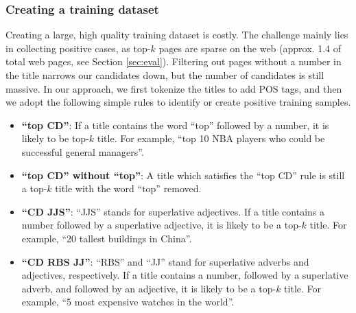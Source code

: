 \subsubsection{Creating a training dataset}
\label{sec:titleDataSet}
Creating a large, high quality training dataset is costly. The
challenge mainly lies in collecting positive cases, as top-$k$ pages
are sparse on the web (approx. 1.4\textperthousand{} of total web pages, see
Section \ref{sec:eval}). Filtering out pages without a number in
the title narrows our candidates down, but the number of candidates
is still massive.
In our approach, we first tokenize the titles to add POS
tags, and then we adopt the following simple rules to identify
or create positive training samples.
\begin{itemize}
\item \textbf{``top CD''}: If a title contains the word ``top''
  followed by a number, it is likely to be top-$k$ title. For example,
  ``top 10 NBA players who could be successful general managers''.
\item \textbf{``top CD'' without ``top''}: A title which satisfies the
``top CD'' rule is still a top-$k$ title with the word ``top'' removed.
\item \textbf{``CD JJS''}: ``JJS'' stands for superlative adjectives.
  If a title contains a number followed by a superlative adjective, it
  is likely to be a top-$k$ title.  For example, ``20 tallest
  buildings in China''.
\item \textbf{``CD RBS JJ''}: ``RBS'' and ``JJ'' stand for superlative
  adverbs and adjectives, respectively.  If a title contains a number,
  followed by a superlative adverb, and followed by an adjective, it is
  likely to be a top-$k$ title.  For example, ``5 most expensive
  watches in the world''.
\end{itemize}


